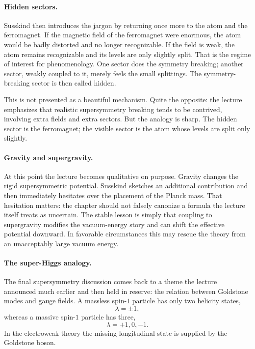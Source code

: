 \paragraph{Hidden sectors.}
Susskind then introduces the jargon by returning once more to the atom and the ferromagnet. If the magnetic field of the ferromagnet were enormous, the atom would be badly distorted and no longer recognizable. If the field is weak, the atom remains recognizable and its levels are only slightly split. That is the regime of interest for phenomenology. One sector does the symmetry breaking; another sector, weakly coupled to it, merely feels the small splittings. The symmetry-breaking sector is then called hidden.

This is not presented as a beautiful mechanism. Quite the opposite: the lecture emphasizes that realistic supersymmetry breaking tends to be contrived, involving extra fields and extra sectors. But the analogy is sharp. The hidden sector is the ferromagnet; the visible sector is the atom whose levels are split only slightly.

\paragraph{Gravity and supergravity.}
At this point the lecture becomes qualitative on purpose. Gravity changes the rigid supersymmetric potential. Susskind sketches an additional contribution and then immediately hesitates over the placement of the Planck mass. That hesitation matters: the chapter should not falsely canonize a formula the lecture itself treats as uncertain. The stable lesson is simply that coupling to supergravity modifies the vacuum-energy story and can shift the effective potential downward. In favorable circumstances this may rescue the theory from an unacceptably large vacuum energy.

\paragraph{The super-Higgs analogy.}
The final supersymmetry discussion comes back to a theme the lecture announced much earlier and then held in reserve: the relation between Goldstone modes and gauge fields. A massless spin-\(1\) particle has only two helicity states,
\begin{equation}
\lambda=\pm 1,
\end{equation}
whereas a massive spin-\(1\) particle has three,
\begin{equation}
\lambda=+1,0,-1.
\end{equation}
In the electroweak theory the missing longitudinal state is supplied by the Goldstone boson.


